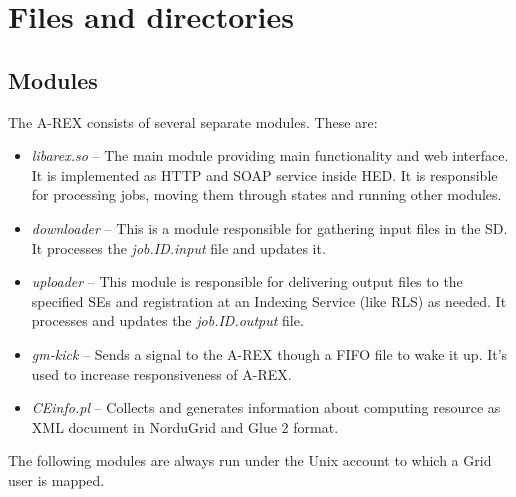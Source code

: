 \documentclass{article}                            %
\begin{document}
\section{Files and directories\label{sec:files and directories}}

\subsection{Modules}

The A-REX consists of several separate modules. These are:

\begin{itemize}
\item \textit{libarex.so} -- The main module providing main functionality
and web interface. It is implemented as HTTP and SOAP service inside
HED. It is responsible for processing jobs, moving them through states
and running other modules.
\item \textit{downloader} -- This is a module responsible for gathering input
files in the SD. It processes the \textit{job.ID.input} file and updates
it.
\item \textit{uploader} -- This module is responsible for delivering output
files to the specified SEs and registration at an Indexing Service
(like RLS) as needed. It processes and updates the \textit{job.ID.output}
file.
\end{itemize}



\begin{itemize}
\item \emph{gm-kick} -- Sends a signal to the A-REX though a FIFO file to
wake it up. It's used to increase responsiveness of A-REX.
\item \emph{CEinfo.pl} -- Collects and generates information about computing
resource as XML document in NorduGrid and Glue 2 format.
\end{itemize}

The following modules are always run under the Unix account to which
a Grid user is mapped.
\end{document}
